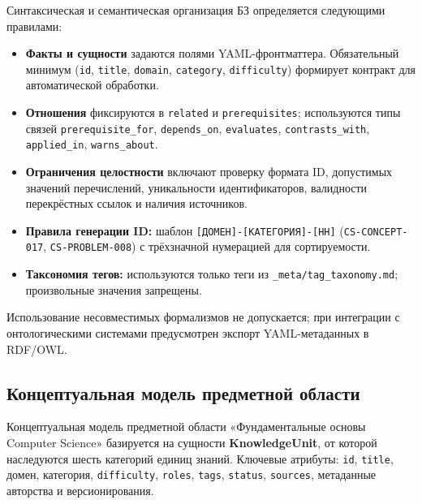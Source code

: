 Синтаксическая и семантическая организация БЗ определяется следующими правилами:

\begin{itemize}
    \item \textbf{Факты и сущности} задаются полями YAML-фронтматтера. Обязательный минимум (\texttt{id}, \texttt{title}, \texttt{domain}, \texttt{category}, \texttt{difficulty}) формирует контракт для автоматической обработки.
    
    \item \textbf{Отношения} фиксируются в \texttt{related} и \texttt{prerequisites}; используются типы связей \texttt{prerequisite\_for}, \texttt{depends\_on}, \texttt{evaluates}, \texttt{contrasts\_with}, \texttt{applied\_in}, \texttt{warns\_about}.
    
    \item \textbf{Ограничения целостности} включают проверку формата ID, допустимых значений перечислений, уникальности идентификаторов, валидности перекрёстных ссылок и наличия источников.
    
    \item \textbf{Правила генерации ID:} шаблон \texttt{[ДОМЕН]-[КАТЕГОРИЯ]-[НН]} (\texttt{CS-CONCEPT-017}, \texttt{CS-PROBLEM-008}) с трёхзначной нумерацией для сортируемости.
    
    \item \textbf{Таксономия тегов:} используются только теги из \texttt{\_meta/tag\_taxonomy.md}; произвольные значения запрещены.
\end{itemize}

Использование несовместимых формализмов не допускается; при интеграции с онтологическими системами предусмотрен экспорт YAML-метаданных в RDF/OWL.

\subsection{Концептуальная модель предметной области}


Концептуальная модель предметной области «Фундаментальные основы Computer Science» базируется на сущности \textbf{KnowledgeUnit}, от которой наследуются шесть категорий единиц знаний. Ключевые атрибуты: \texttt{id}, \texttt{title}, домен, категория, \texttt{difficulty}, \texttt{roles}, \texttt{tags}, \texttt{status}, \texttt{sources}, метаданные авторства и версионирования.


